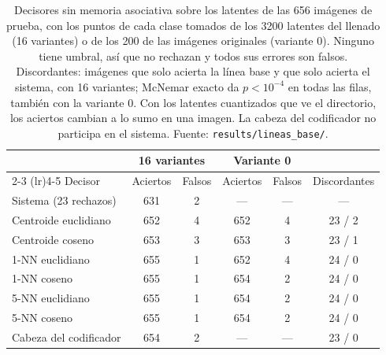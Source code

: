 \begin{table}[H]
    \centering
    \caption[Decisores sin memoria asociativa sobre los latentes de las imágenes]{Decisores sin memoria asociativa sobre los latentes de las 656 imágenes de
    prueba, con los puntos de cada clase tomados de los 3200 latentes del llenado (16
    variantes) o de los 200 de las imágenes originales (variante 0). Ninguno tiene umbral,
    así que no rechazan y todos sus errores son falsos. Discordantes: imágenes que solo
    acierta la línea base y que solo acierta el sistema, con 16 variantes; McNemar exacto
    da $p < 10^{-4}$ en todas las filas, también con la variante 0. Con los latentes
    cuantizados que ve el directorio, los aciertos cambian a lo sumo en una imagen. La
    cabeza del codificador no participa en el sistema. Fuente:
    \texttt{results/lineas\_base/}.}
    \label{tab:lineas-base-imagen}
    \small
    \begin{tabular}{lccccc}
        \toprule
        & \multicolumn{2}{c}{16 variantes} & \multicolumn{2}{c}{Variante 0} & \\
        \cmidrule(lr){2-3} \cmidrule(lr){4-5}
        Decisor & Aciertos & Falsos & Aciertos & Falsos & Discordantes \\
        \midrule
        Sistema (23 rechazos)  & 631 & 2 & ---  & --- & ---    \\
        Centroide euclidiano   & 652 & 4 & 652  & 4   & 23 / 2 \\
        Centroide coseno       & 653 & 3 & 653  & 3   & 23 / 1 \\
        1-NN euclidiano        & 655 & 1 & 652  & 4   & 24 / 0 \\
        1-NN coseno            & 655 & 1 & 654  & 2   & 24 / 0 \\
        5-NN euclidiano        & 655 & 1 & 654  & 2   & 24 / 0 \\
        5-NN coseno            & 655 & 1 & 654  & 2   & 24 / 0 \\
        \midrule
        Cabeza del codificador & 654 & 2 & ---  & --- & 23 / 0 \\
        \bottomrule
    \end{tabular}
\end{table}

